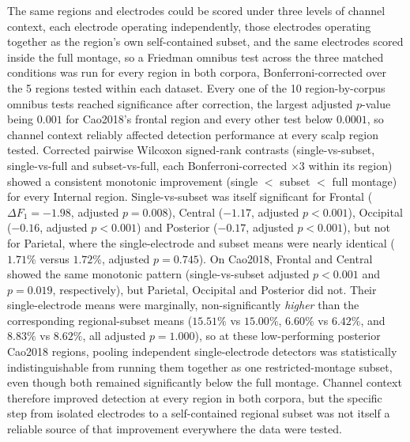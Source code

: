 The same regions and electrodes could be scored under three levels of channel context, each electrode operating independently, those electrodes operating together as the region's own self-contained subset, and the same electrodes scored inside the full montage, so a Friedman omnibus test across the three matched conditions was run for every region in both corpora, Bonferroni-corrected over the 5 regions tested within each dataset.
Every one of the 10 region-by-corpus omnibus tests reached significance after correction, the largest adjusted $p$-value being $0.001$ for Cao2018's frontal region and every other test below $0.0001$, so channel context reliably affected detection performance at every scalp region tested. Corrected pairwise Wilcoxon signed-rank contrasts (single-vs-subset, single-vs-full and subset-vs-full, each Bonferroni-corrected $\times 3$ within its region) showed a consistent monotonic improvement (single $<$ subset $<$ full montage) for every Internal region. Single-vs-subset was itself significant for Frontal ($\Delta F_1=-1.98$, adjusted $p=0.008$), Central ($-1.17$, adjusted $p<0.001$), Occipital ($-0.16$, adjusted $p<0.001$) and Posterior ($-0.17$, adjusted $p<0.001$), but not for Parietal, where the single-electrode and subset means were nearly identical ($1.71\%$ versus $1.72\%$, adjusted $p=0.745$). On Cao2018, Frontal and Central showed the same monotonic pattern (single-vs-subset adjusted $p<0.001$ and $p=0.019$, respectively), but Parietal, Occipital and Posterior did not. Their single-electrode means were marginally, non-significantly \emph{higher} than the corresponding regional-subset means ($15.51\%$ vs $15.00\%$, $6.60\%$ vs $6.42\%$, and $8.83\%$ vs $8.62\%$, all adjusted $p=1.000$), so at these low-performing posterior Cao2018 regions, pooling independent single-electrode detectors was statistically indistinguishable from running them together as one restricted-montage subset, even though both remained significantly below the full montage. Channel context therefore improved detection at every region in both corpora, but the specific step from isolated electrodes to a self-contained regional subset was not itself a reliable source of that improvement everywhere the data were tested.
